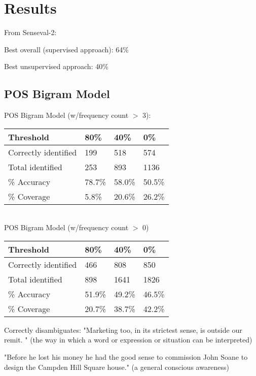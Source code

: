 \documentclass[10pt, letterpaper]{article}
\begin{document}
	\section{Results}
	From Senseval-2:

	Best overall (supervised approach): 64$\%$	

	Best unsupervised approach: 40$\%$

	\subsection{POS Bigram Model}

	POS Bigram Model (w/frequency count $>$ 3): 
	\begin{table}[h]
	\begin{tabular}{|l|l|l|l|}
	\hline
	Threshold            & 80\%   & 40\%   & 0\%    \\ \hline
	Correctly identified & 199    & 518    & 574    \\ \hline
	Total identified     & 253    & 893    & 1136   \\ \hline
	\% Accuracy          & 78.7\% & 58.0\% & 50.5\% \\ \hline
	\% Coverage			 & 5.8\%  & 20.6\% & 26.2\% \\ \hline
	\end{tabular}
	\end{table}\\
	POS Bigram Model (w/frequency count $>$ 0)
	\begin{table}[h]
	\begin{tabular}{|l|l|l|l|}
	\hline
	Threshold            & 80\%   & 40\%   & 0\%    \\ \hline
	Correctly identified & 466    & 808    & 850    \\ \hline
	Total identified     & 898    & 1641   & 1826   \\ \hline
	\% Accuracy          & 51.9\% & 49.2\% & 46.5\% \\ \hline
	\% Coverage          & 20.7\% & 38.7\% & 42.2\% \\ \hline
	\end{tabular}
	\end{table}

	Correctly disambiguates:
	"Marketing too, in its strictest sense, is outside our remit. " (the way in which a word or expression or situation can be interpreted)	

	"Before he lost his money he had the good sense to commission John Soane to design the Campden Hill Square house." (a general conscious awareness)
\end{document}
